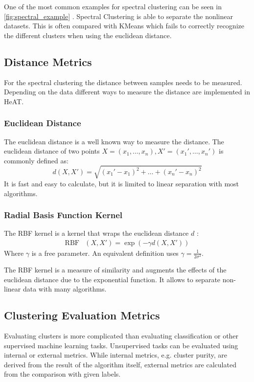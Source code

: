 One of the most common examples for spectral clustering can be seen in \cref{fig:spectral_example} \cite{noauthor_23_2020}. Spectral Clustering is able to
separate the nonlinear datasets. This is often compared with KMeans which fails to correctly recognize the different clusters when using the euclidean distance.

\subsection{Distance Metrics}
\label{subsec:distance_metrics}
For the spectral clustering the distance between samples needs to be measured. Depending on the data different ways to measure the distance are implemented in \gls{HeAT}.

\subsubsection{Euclidean Distance}
The euclidean distance is a well known way to measure the distance. The euclidean distance of two points \(X = (x_1, \ldots, x_n ), X' = (x_1', \ldots, x_n')\) is commonly defined  as:
\[
  d\left(X, X'\right) = \sqrt{{(x_1' - x_1)}^2 + \ldots + {(x_n' - x_n)}^2}
\]
It is fast and easy to calculate, but it is limited to  linear separation with most algorithms.

\subsubsection{Radial Basis Function Kernel}
The RBF kernel is a kernel that wraps the euclidean distance \(d\) \cite{vert_primer_2004}:
\begin{align*}
  \mathop{RBF} & \left(X, X'\right) = \exp(-\gamma d(X, X'))
\end{align*}
Where \(\gamma\) is a free parameter. An equivalent definition uses \(\gamma = \frac{1}{2\sigma^2}\).

The RBF kernel is a measure of similarity and augments the effects of the euclidean distance due to the exponential function.
It allows to separate non-linear data with many algorithms.


\subsection{Clustering Evaluation Metrics}
\label{subsec:clustering_evaluation_metrics}

Evaluating clusters is more complicated than evaluating classification or other supervised machine learning tasks.
Unsupervised tasks can be evaluated using internal or external metrics.
While internal metrics, e.g. cluster purity, are derived from the result of the algorithm itself, external metrics are calculated from the comparison with given labels.

